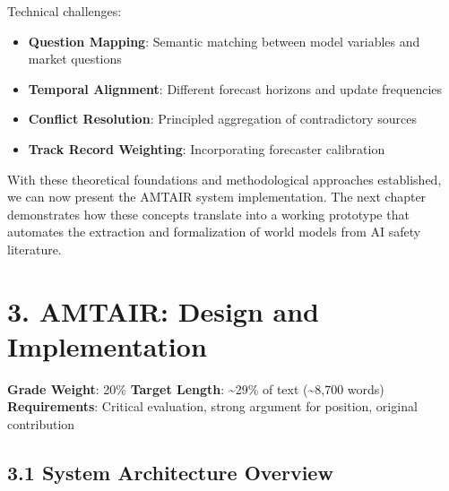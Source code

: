 \documentclass[
  11pt,
  letterpaper,
]{book}
\providecommand{\tightlist}{%
  \setlength{\itemsep}{0pt}\setlength{\parskip}{0pt}}
\begin{document}
Technical challenges:

\begin{itemize}
\tightlist
\item
  \textbf{Question Mapping}: Semantic matching between model variables
  and market questions
\item
  \textbf{Temporal Alignment}: Different forecast horizons and update
  frequencies
\item
  \textbf{Conflict Resolution}: Principled aggregation of contradictory
  sources
\item
  \textbf{Track Record Weighting}: Incorporating forecaster calibration
\end{itemize}

With these theoretical foundations and methodological approaches
established, we can now present the AMTAIR system implementation. The
next chapter demonstrates how these concepts translate into a working
prototype that automates the extraction and formalization of world
models from AI safety literature.


\chapter*{3. AMTAIR: Design and Implementation}\label{sec-amtair}


\begin{tcolorbox}[enhanced jigsaw, opacityback=0, leftrule=.75mm, breakable, coltitle=black, colbacktitle=quarto-callout-note-color!10!white, bottomrule=.15mm, rightrule=.15mm, toprule=.15mm, left=2mm, bottomtitle=1mm, arc=.35mm, toptitle=1mm, titlerule=0mm, title=\textcolor{quarto-callout-note-color}{\faInfo}\hspace{0.5em}{Chapter Overview}, opacitybacktitle=0.6, colframe=quarto-callout-note-color-frame, colback=white]

\textbf{Grade Weight}: 20\% \textbar{} \textbf{Target Length}:
\textasciitilde29\% of text (\textasciitilde8,700 words)\\
\textbf{Requirements}: Critical evaluation, strong argument for
position, original contribution

\end{tcolorbox}

\section*{3.1 System Architecture
Overview}\label{sec-system-architecture}
\end{document}
